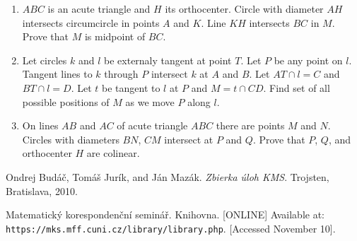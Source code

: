 \documentclass[11pt,a5paper]{article}
\begin{document}
\begin{enumerate}
	\item{$ABC$ is an acute triangle and $H$ its orthocenter. Circle with diameter $AH$ intersects circumcircle in points $A$ and $K$. Line $KH$ intersects $BC$ in $M$. Prove that $M$ is midpoint of $BC$.}
	
	\item{Let circles $k$ and $l$ be externaly tangent at point $T$. Let $P$ be any point on $l$. Tangent lines to $k$ through $P$ intersect $k$ at $A$ and $B$. Let $AT \cap l = C$ and $BT \cap l = D$. Let $t$ be tangent to $l$ at $P$ and $M = t \cap CD$. Find set of all possible positions of $M$ as we move $P$ along $l$.}
	
	\item{On lines $AB$ and $AC$ of acute triangle $ABC$ there are points $M$ and $N$. Circles with diameters $BN$, $CM$ intersect at $P$ and $Q$. Prove that $P$, $Q$, and orthocenter $H$ are colinear.}

\end{enumerate}

\begin{thebibliography}{9}
 Ondrej Budáč, Tomáš Jurík, and Ján Mazák. 
	\emph{Zbierka úloh KMS}. Trojsten, Bratislava, 2010.
	
 Matematický korespondenční seminář. Knihovna. [ONLINE] Available at: \texttt{https://mks.mff.cuni.cz/library/library.php}. [Accessed November 10].
\end{thebibliography}
\end{document}
